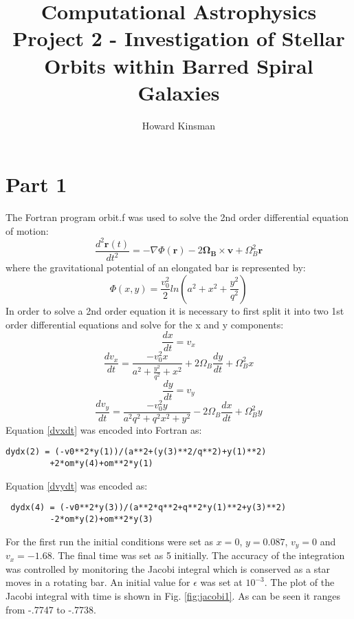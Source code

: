 \documentclass[a4paper,12pt]{article}
\author{Howard Kinsman}
\title{Computational Astrophysics Project 2 - Investigation of Stellar Orbits within Barred Spiral Galaxies}
\begin{document}
\maketitle
\section{Part 1}
The Fortran program orbit.f was used to solve the 2nd order differential equation of motion: 
\begin{equation} \label{motion}
   \frac{d^2\mathbf{r}(t)}{dt^2}=-\nabla\Phi\left(\mathbf{r}\right)-2\mathbf{\Omega_B}\times\mathbf{v}+\Omega_B^2\mathbf{r}
\end{equation}
where the gravitational potential of an elongated bar is represented by:
\begin{equation} \label{grav}
\Phi\left(x,y\right)=\frac{v_0^2}{2}ln\left(a^2+x^2+\frac{y^2}{q^2}\right)
\end{equation}
In order to solve a 2nd order equation it is necessary to first split it into two 1st order differential equations and solve for the x and y components:
\begin{equation} \label{dxdt}
\frac{dx}{dt}=v_x
\end{equation}
\begin{equation} \label{dvxdt}
\frac{dv_x}{dt}=\frac{-v_0^2x}{a^2+\frac{y^2}{q^2}+x^2}+2\Omega_B\frac{dy}{dt}+\Omega_B^2x
\end{equation}
\begin{equation} \label{dydt}
\frac{dy}{dt}=v_y
\end{equation}
\begin{equation} \label{dvydt}
\frac{dv_y}{dt}=\frac{-v_0^2y}{a^2q^2+q^2x^2+y^2}-2\Omega_B\frac{dx}{dt}+\Omega_B^2y
\end{equation}
\newpage
Equation \ref{dvxdt} was encoded into Fortran as:
\begin{lstlisting}
dydx(2) = (-v0**2*y(1))/(a**2+(y(3)**2/q**2)+y(1)**2)
         +2*om*y(4)+om**2*y(1)
\end{lstlisting}
Equation \ref{dvydt} was encoded as:
\begin{lstlisting}
 dydx(4) = (-v0**2*y(3))/(a**2*q**2+q**2*y(1)**2+y(3)**2)
         -2*om*y(2)+om**2*y(3) 
\end{lstlisting}

For the first run the initial conditions were set as $x=0$, $y=0.087$, $v_y=0$ and $v_x=-1.68$. The final time was set as 5 initially.
The accuracy of the integration was controlled by monitoring the Jacobi integral
which is conserved as a star moves in a rotating bar. An initial value for $\epsilon$ was set at $10^{-3}$. The plot of the Jacobi integral with time is shown in Fig. \ref{fig:jacobi1}. As can be seen it ranges from -.7747 to -.7738.
\end{document}
